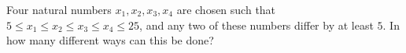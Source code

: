 Four natural numbers $x_{1}, x_{2}, x_{3}, x_{4}$ are chosen such that $5 \leqslant x_{1} \leqslant x_{2} \leqslant x_{3} \leqslant x_{4}\leqslant25$, and any two of these numbers differ by at least $5$. In how many different ways can this be done?
